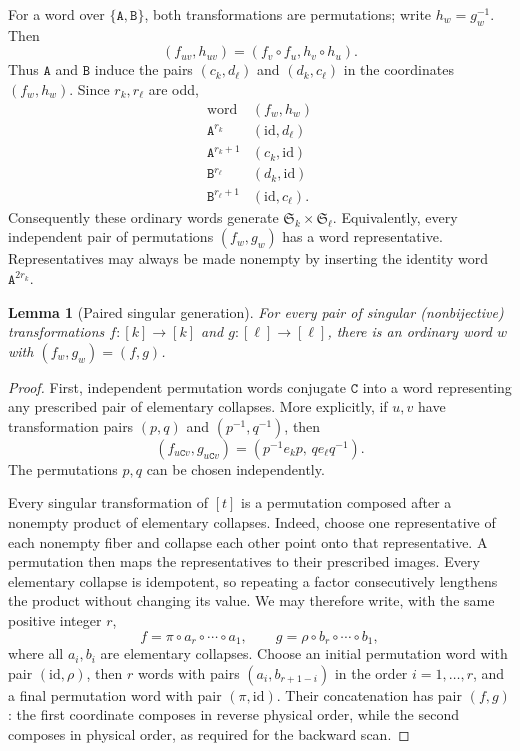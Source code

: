 \documentclass[11pt,a4paper]{article}
\newtheorem{lemma}[theorem]{Lemma}
\theoremstyle{definition}
\theoremstyle{remark}
\newcommand{\Sym}{\mathfrak S}
\begin{document}
For a word over $\{\mathtt A,\mathtt B\}$, both transformations are
permutations; write $h_w=g_w^{-1}$. Then
\[
 (f_{uv},h_{uv})=(f_v\circ f_u,h_v\circ h_u).
\]
Thus $\mathtt A$ and $\mathtt B$ induce the pairs $(c_k,d_\ell)$
and $(d_k,c_\ell)$ in the coordinates $(f_w,h_w)$. Since $r_k,r_\ell$ are odd,
\[
\begin{array}{c|c}
 \text{word}&(f_w,h_w)\\ \hline
 \mathtt A^{r_k}&(\mathrm{id},d_\ell)\\
 \mathtt A^{r_k+1}&(c_k,\mathrm{id})\\
 \mathtt B^{r_\ell}&(d_k,\mathrm{id})\\
 \mathtt B^{r_\ell+1}&(\mathrm{id},c_\ell).
\end{array}
\]
Consequently these ordinary words generate $\Sym_k\times\Sym_\ell$.
Equivalently, every independent pair of permutations $(f_w,g_w)$ has a
word representative. Representatives may always be made nonempty by
inserting the identity word $\mathtt A^{2r_k}$.

\begin{lemma}[Paired singular generation]\label{lem:paired-generation}
For every pair of singular (nonbijective) transformations
$f:[k]\to[k]$ and $g:[\ell]\to[\ell]$, there is an ordinary word $w$
with $(f_w,g_w)=(f,g)$.
\end{lemma}
\begin{proof}
First, independent permutation words conjugate $\mathtt C$ into a word
representing any prescribed pair of elementary collapses. More explicitly,
if $u,v$ have transformation pairs $(p,q)$ and $(p^{-1},q^{-1})$, then
\[
 (f_{u\mathtt Cv},g_{u\mathtt Cv})
   =(p^{-1}e_kp,\,q e_\ell q^{-1}).
\]
The permutations $p,q$ can be chosen independently.

Every singular transformation of $[t]$ is a permutation composed after a
nonempty product of elementary collapses. Indeed, choose one representative
of each nonempty fiber and collapse each other point onto that representative.
A permutation then maps the representatives to their prescribed images.
Every elementary collapse is idempotent, so repeating a factor
consecutively lengthens the product without changing its value.
We may therefore write, with the same positive integer $r$,
\[
 f=\pi\circ a_r\circ\cdots\circ a_1,
 \qquad
 g=\rho\circ b_r\circ\cdots\circ b_1,
\]
where all $a_i,b_i$ are elementary collapses. Choose an initial permutation word
with pair $(\mathrm{id},\rho)$, then $r$ words with pairs
$(a_i,b_{r+1-i})$ in the order $i=1,\ldots,r$, and a final permutation word with
pair $(\pi,\mathrm{id})$. Their concatenation has pair $(f,g)$: the first
coordinate composes in reverse physical order, while the second composes
in physical order, as required for the backward scan.
\end{proof}
\end{document}
